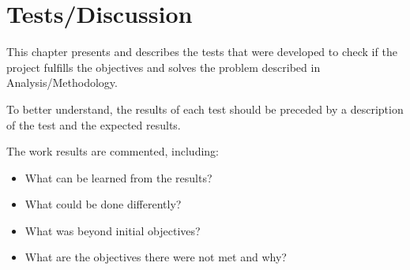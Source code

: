 \chapter{Tests/Discussion}\label{cap:test}

This chapter presents and describes the tests that were developed to check if the project fulfills the objectives and solves the problem described in Analysis/Methodology.

To better understand, the results of each test should be preceded by a description of the test and the expected results.

The work results are commented, including:

\begin{itemize}
	\item  What can be learned from the results?
	\item What could be done differently? 
	\item What was beyond initial objectives?
	\item What are the objectives there were not met and why?
\end{itemize}

